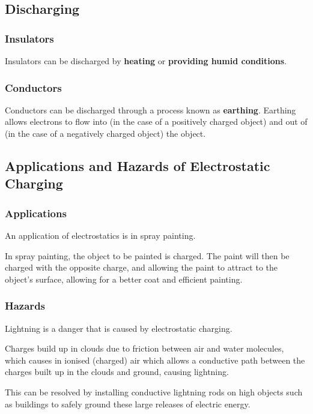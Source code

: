 \documentclass[../main.tex]{subfiles}
\begin{document}
		\subsection{Discharging}
		\subsubsection{Insulators}
		Insulators can be discharged by \textbf{heating} or \textbf{providing humid conditions}.
		
		\subsubsection{Conductors}
		Conductors can be discharged through a process known as \textbf{earthing}. Earthing allows electrons to flow into (in the case of a positively charged object) and out of (in the case of a negatively charged object) the object.
		\subsection{Applications and Hazards of Electrostatic Charging }
		\subsubsection{Applications}
		An application of electrostatics is in spray painting.
		
		In spray painting, the object to be painted is charged. The paint will then be charged with the opposite charge, and allowing the paint to attract to the object's surface, allowing for a better coat and efficient painting.
		
		\subsubsection{Hazards}
		Lightning is a danger that is caused by electrostatic charging.
		
		Charges build up in clouds due to friction between air and water molecules, which causes in ionised (charged) air which allows a conductive path between the charges built up in the clouds and ground, causing lightning.
		
		This can be resolved by installing conductive lightning rods on high objects such as buildings to safely ground these large releases of electric energy.
\end{document}
